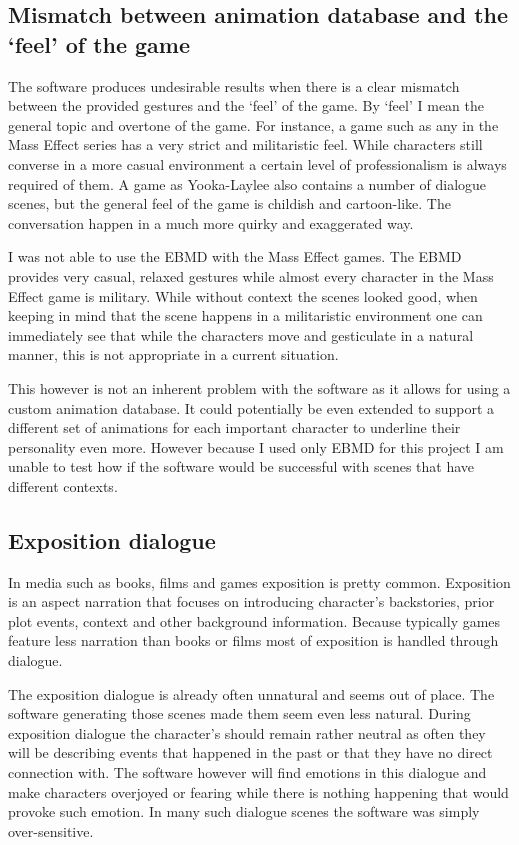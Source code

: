 \subsection{Mismatch between animation database and the `feel' of the game}
The software produces undesirable results when there is a clear mismatch between the provided gestures and the `feel' of the game. By `feel' I mean the general topic and overtone of the game. For instance, a game such as any in the Mass Effect series has a very strict and militaristic feel. While characters still converse in a more casual environment a certain level of professionalism is always required of them. A game as Yooka-Laylee also contains a number of dialogue scenes, but the general feel of the game is childish and cartoon-like. The conversation happen in a much more quirky and exaggerated way.

I was not able to use the EBMD with the Mass Effect games. The EBMD provides very casual, relaxed gestures while almost every character in the Mass Effect game is military. While without context the scenes looked good, when keeping in mind that the scene happens in a militaristic environment one can immediately see that while the characters move and gesticulate in a natural manner, this is not appropriate in a current situation.

This however is not an inherent problem with the software as it allows for using a custom animation database. It could potentially be even extended to support a different set of animations for each important character to underline their personality even more. However because I used only EBMD for this project I am unable to test how if the software would be successful with scenes that have different contexts.

\subsection{Exposition dialogue}
In media such as books, films and games exposition is pretty common. Exposition is an aspect narration that focuses on introducing character's backstories, prior plot events, context and other background information. Because typically games feature less narration than books or films most of exposition is handled through dialogue.

The exposition dialogue is already often unnatural and seems out of place. The software generating those scenes made them seem even less natural. During exposition dialogue the character's should remain rather neutral as often they will be describing events that happened in the past or that they have no direct connection with. The software however will find emotions in this dialogue and make characters overjoyed or fearing while there is nothing happening that would provoke such emotion. In many such dialogue scenes the software was simply over-sensitive.

